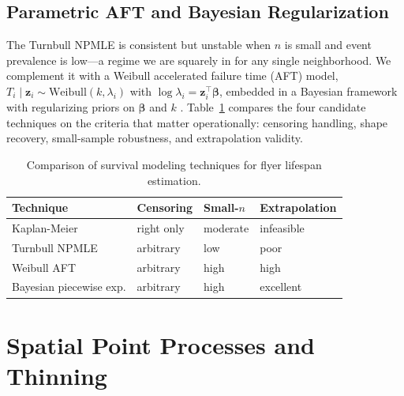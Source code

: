 \documentclass[sigconf,nonacm]{acmart}
\begin{document}
\subsection{Parametric AFT and Bayesian Regularization}

The Turnbull NPMLE is consistent but unstable when $n$ is small and event prevalence is low---a regime we are squarely in for any single neighborhood. We complement it with a Weibull accelerated failure time (AFT) model, $T_i \mid \mathbf{z}_i \sim \text{Weibull}(k, \lambda_i)$ with $\log \lambda_i = \mathbf{z}_i^\top \boldsymbol{\beta}$, embedded in a Bayesian framework with regularizing priors on $\boldsymbol{\beta}$ and $k$ \cite{robust-survival}. Table~\ref{tab:survival} compares the four candidate techniques on the criteria that matter operationally: censoring handling, shape recovery, small-sample robustness, and extrapolation validity.

\begin{table}[t]
    \centering
    \small
    \caption{Comparison of survival modeling techniques for flyer lifespan estimation.}
    \label{tab:survival}
    \begin{tabular}{p{2.0cm}p{1.6cm}p{1.6cm}p{1.6cm}}
        \toprule
        Technique & Censoring & Small-$n$ & Extrapolation \\
        \midrule
        Kaplan-Meier & right only & moderate & infeasible \\
        Turnbull NPMLE & arbitrary & low & poor \\
        Weibull AFT & arbitrary & high & high \\
        Bayesian piecewise exp. & arbitrary & high & excellent \\
        \bottomrule
    \end{tabular}
\end{table}

\section{Spatial Point Processes and Thinning}
\label{sec:point-process}
\end{document}
